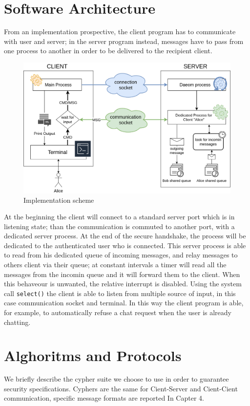 \documentclass[11pt]{report}
\begin{document}
\section{Software Architecture}
From an implementation prospective, the client program has to communicate with user and server; in the
server program instead, messages have to pass from one process to another in order to be delivered to the
recipient client.
\begin{figure}[H]
	\centering
	\includegraphics[scale=0.24]{img/Implementation_scheme.png}
	\caption{Implementation scheme}
	\label {img: Implementation_scheme}
\end{figure}
At the beginning the client will connect to a standard server port which is in listening state; than the communication
is commuted to another port, with a dedicated server process. At the end of the secure handshake, the process will be 
dedicated to the authenticated user who is connected. This server process is able to read from his dedicated queue of 
incoming messages, and relay messages to others client via their queue; at constant intervals a timer will read all the 
messages from the incomin queue and it will forward them to the client. When this behaveour is unwanted, the relative interrupt
is disabled.
Using the system call \texttt{select()} the client is able to listen from multiple source of input, in this
case communication socket and terminal. In this way the client program is able, for example, to automatically refuse a chat request 
when the user is already chatting.

\section{Alghoritms and Protocols}
We briefly describe the cypher suite we choose to use in order to guarantee security specifications.
Cyphers are the same for Cient-Server and Cient-Cient communication, specific message formats are reported In
Capter 4.
\end{document}

